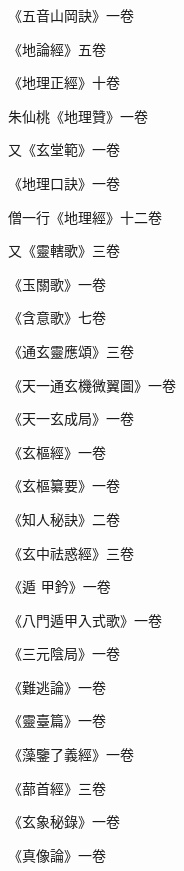 \begin{pinyinscope}
 《五音山岡訣》一卷



 《地論經》五卷



 《地理正經》十卷



 朱仙桃《地理贊》一卷



 又《玄堂範》一卷



 《地理口訣》一卷



 僧一行《地理經》十二卷



 又《靈轄歌》三卷



 《玉關歌》一卷



 《含意歌》七卷



 《通玄靈應頌》三卷



 《天一通玄機微翼圖》一卷



 《天一玄成局》一卷



 《玄樞經》一卷



 《玄樞纂要》一卷



 《知人秘訣》二卷



 《玄中祛惑經》三卷



 《遁
 甲鈐》一卷



 《八門遁甲入式歌》一卷



 《三元陰局》一卷



 《難逃論》一卷



 《靈臺篇》一卷



 《藻鑒了義經》一卷



 《蔀首經》三卷



 《玄象秘錄》一卷



 《真像論》一卷




\end{pinyinscope}
